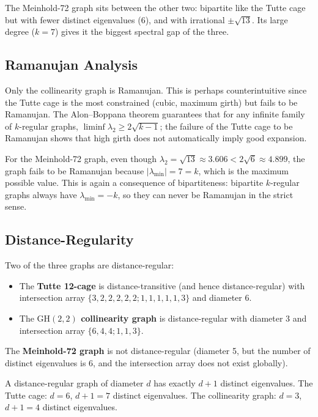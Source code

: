 \documentclass[11pt,a4paper]{article}
\theoremstyle{plain}
\theoremstyle{definition}
\theoremstyle{remark}
\newcommand{\GH}{\mathrm{GH}(2,2)}
\begin{document}
The Meinhold-72 graph sits between the other two: bipartite like the Tutte cage but
with fewer distinct eigenvalues (6), and with irrational $\pm\sqrt{13}$.  Its large
degree ($k = 7$) gives it the biggest spectral gap of the three.

\subsection{Ramanujan Analysis}

Only the collinearity graph is Ramanujan.  This is perhaps counterintuitive since the
Tutte cage is the most constrained (cubic, maximum girth) but fails to be Ramanujan.
The Alon--Boppana theorem guarantees that for any infinite family of $k$-regular graphs,
$\liminf \lambda_2 \geq 2\sqrt{k-1}$; the failure of the Tutte cage to be Ramanujan
shows that high girth does not automatically imply good expansion.

For the Meinhold-72 graph, even though $\lambda_2 = \sqrt{13} \approx 3.606 < 2\sqrt{6}
\approx 4.899$, the graph fails to be Ramanujan because $|\lambda_{\min}| = 7 = k$,
which is the maximum possible value.  This is again a consequence of bipartiteness:
bipartite $k$-regular graphs always have $\lambda_{\min} = -k$, so they can never be
Ramanujan in the strict sense.

\subsection{Distance-Regularity}

Two of the three graphs are distance-regular:
\begin{itemize}
  \item The \textbf{Tutte 12-cage} is distance-transitive (and hence distance-regular)
        with intersection array $\{3,2,2,2,2,2;1,1,1,1,1,3\}$ and diameter 6.
  \item The \textbf{$\GH$ collinearity graph} is distance-regular with diameter 3
        and intersection array $\{6,4,4;1,1,3\}$.
\end{itemize}
The \textbf{Meinhold-72 graph} is not distance-regular (diameter 5, but the number of
distinct eigenvalues is 6, and the intersection array does not exist globally).

A distance-regular graph of diameter $d$ has exactly $d+1$ distinct eigenvalues.
The Tutte cage: $d = 6$, $d+1 = 7$ distinct eigenvalues. \checkmark
The collinearity graph: $d = 3$, $d+1 = 4$ distinct eigenvalues. \checkmark
\end{document}
